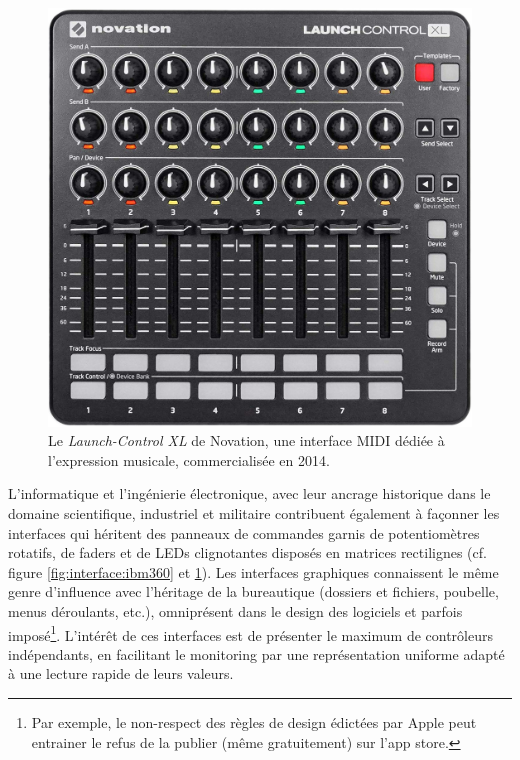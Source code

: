 \begin{figure}[!htbp]
\begin{minipage}[t]{0.48\textwidth}
	    \includegraphics[width=\linewidth]{gfx/05_interfaces/NovationLaunchControlXL.jpg}
		\caption[L'interface MIDI Novation Launch-Control-XL]{Le \textit{Launch-Control XL} de Novation, une interface \gls{MIDI} dédiée à l'expression musicale, commercialisée en 2014.}
		\label{fig:interface:launchpad-controlXL}
	\end{minipage}
\end{figure}

\noindent L'informatique et l'ingénierie électronique, avec leur ancrage historique dans le domaine scientifique, industriel et militaire contribuent également à façonner les interfaces qui héritent des panneaux de commandes garnis de potentiomètres rotatifs, de faders et de LEDs clignotantes disposés en matrices rectilignes (cf. figure \ref{fig:interface:ibm360} et \ref{fig:interface:launchpad-controlXL}). Les interfaces graphiques connaissent le même genre d'influence avec l'héritage de la bureautique (dossiers et fichiers, poubelle, menus déroulants, etc.), omniprésent dans le design des logiciels et parfois imposé\footnote{Par exemple, le non-respect des règles de design édictées par Apple peut entrainer le refus de la publier (même gratuitement) sur l'app store.}. L'intérêt de ces interfaces est de présenter le maximum de contrôleurs indépendants, en facilitant le monitoring par une représentation uniforme adapté à une lecture rapide de leurs valeurs.

